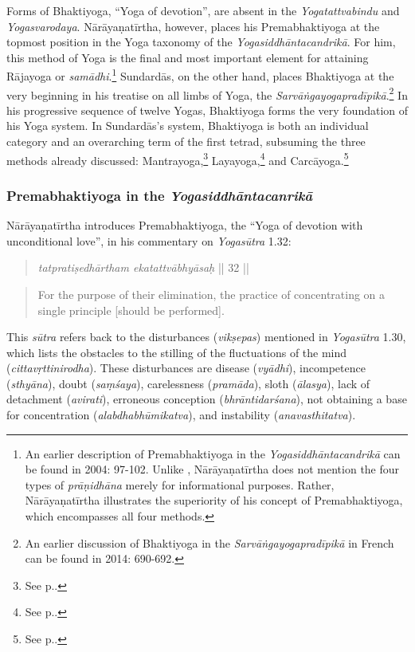 Forms of Bhaktiyoga, ``Yoga of devotion'', are absent in the \textit{Yogatattvabindu} and \textit{Yogasvarodaya}. Nārāyaṇatīrtha, however, places his Premabhaktiyoga at the topmost position in the Yoga taxonomy of the \textit{Yogasiddhāntacandrikā}. For him, this method of Yoga is the final and most important element for attaining Rājayoga or \textit{samādhi}.\footnote{An earlier description of Premabhaktiyoga in the \textit{Yogasiddhāntacandrikā} can be found in \citeauthor{penna2004} 2004: 97-102. Unlike \citeauthor{penna2004}, Nārāyaṇatīrtha does not mention the four types of \textit{prāṇidhāna} merely for informational purposes. Rather, Nārāyaṇatīrtha illustrates the superiority of his concept of Premabhaktiyoga, which encompasses all four methods.} Sundardās, on the other hand, places Bhaktiyoga at the very beginning in his treatise on all limbs of Yoga, the \textit{Sarvāṅgayogapradīpikā}.\footnote{An earlier discussion of Bhaktiyoga in the \textit{Sarvāṅgayogapradīpikā} in French can be found in \citeauthor{burger2014sarvangayogapradipika} 2014: 690-692.} In his progressive sequence of twelve Yogas, Bhaktiyoga forms the very foundation of his Yoga system. In Sundardās's system, Bhaktiyoga is both an individual category and an overarching term of the first tetrad, subsuming the three methods already discussed: Mantrayoga,\footnote{See p.\pageref{mantrayogaintrosarva}.} Layayoga,\footnote{See p.\pageref{layaintrosarvanga}.} and Carcāyoga.\footnote{See p.\pageref{carcasarvanga}.}

\subsubsection{Premabhaktiyoga in the \emph{Yogasiddhāntacanrikā}}
\label{premabhaktiyoga}

Nārāyaṇatīrtha introduces Premabhaktiyoga, the ``Yoga of devotion with unconditional love'', in his commentary on \textit{Yogasūtra} 1.32:
\begin{quote}
  \textit{tatpratiṣedhārtham ekatattvābhyāsaḥ} || 32 ||
\end{quote}
\begin{quote}
For the purpose of their elimination, the practice of concentrating on a single principle [should be performed].
\end{quote}

This \textit{sūtra} refers back to the disturbances (\textit{vikṣepas}) mentioned in \textit{Yogasūtra} 1.30, which lists the obstacles to the stilling of the fluctuations of the mind (\textit{cittavṛttinirodha}). These disturbances are disease (\textit{vyādhi}), incompetence (\textit{sthyāna}), doubt (\textit{saṃśaya}), carelessness (\textit{pramāda}), sloth (\textit{ālasya}), lack of detachment (\textit{avirati}), erroneous conception (\textit{bhrāntidarśana}), not obtaining a base for concentration (\textit{alabdhabhūmikatva}), and instability (\textit{anavasthitatva}).

